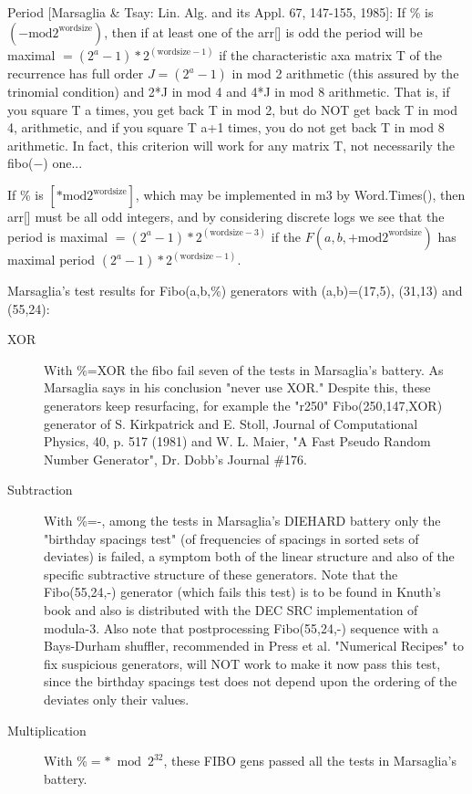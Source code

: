 Period [Marsaglia \& Tsay:  Lin. Alg. and its
   Appl. 67, 147-155, 1985]: If \% is $(- \mbox{mod} 2^{\mbox{wordsize}})$,
then if at least one of the arr[] is odd
the period will be maximal $= (2^a - 1) * 2^{(\mbox{wordsize}-1)}$ if
the characteristic axa matrix T of the recurrence has full order
$J=(2^a - 1)$ in mod 2 arithmetic (this assured by the trinomial condition)
and 2*J in mod 4 and 4*J in mod 8 arithmetic. That is, if you square
T a times, you get back T in mod 2, but do NOT get back T in mod 4,
arithmetic, and if you square T a+1 times, you do not get back T
in mod 8 arithmetic. In fact, this criterion will work for any
matrix T, not necessarily the fibo($-$) one...

If \% is $[* \mbox{mod} 2^{\mbox{wordsize}}]$, which may be implemented in m3 by Word.Times(),
then arr[] must be all odd integers, and by considering discrete logs
we see that the period is maximal $= (2^a - 1) * 2^{(\mbox{wordsize}-3)}$ if
the $F(a,b,+ \mbox{mod} 2^{\mbox{wordsize}})$ has maximal period
$(2^a - 1) * 2^{(\mbox{wordsize}-1)}$.

Marsaglia's test results for Fibo(a,b,\%) generators with
(a,b)=(17,5), (31,13) and (55,24):
\begin{description}
\item[XOR] With \%=XOR the fibo fail seven of the tests in Marsaglia's battery.
As Marsaglia says in his conclusion "never use XOR." Despite this,
these generators keep resurfacing, for example the "r250" Fibo(250,147,XOR)
generator of S. Kirkpatrick and E.  Stoll, Journal of Computational
Physics, 40, p. 517 (1981) and W. L. Maier, "A Fast Pseudo Random
Number Generator", Dr. Dobb's Journal \#176.

\item[Subtraction] With \%=-, among the tests in Marsaglia's DIEHARD battery
only the "birthday spacings test" (of frequencies of spacings in sorted sets 
of deviates) is failed, a symptom both of the linear structure
and also of the specific subtractive structure of these generators.
Note that the Fibo(55,24,-) generator (which fails this test) is to be found
in Knuth's book and also is distributed with the DEC SRC implementation of
modula-3. Also note that postprocessing Fibo(55,24,-) sequence with a
Bays-Durham shuffler, recommended in Press et al. "Numerical Recipes" to
fix suspicious generators, will NOT work to make it now pass this test, since
the birthday spacings test does not depend upon the ordering of the
deviates only their values.

\item[Multiplication] With \%$=* \bmod 2^{32}$, these
FIBO gens passed all the tests in
Marsaglia's battery.
\end{description}

